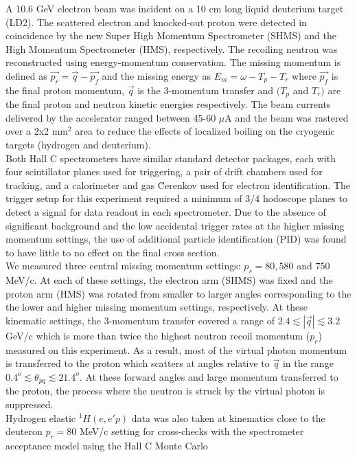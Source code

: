\indent A 10.6 GeV electron beam was incident on a 10 cm long liquid deuterium target (LD2). The scattered electron and knocked-out proton were detected in coincidence
by the new Super High Momentum Spectrometer (SHMS) and the High Momentum Spectrometer (HMS), respectively. The recoiling neutron was reconstructed using energy-momentum conservation. The missing momentum is defined as 
$\vec{p_{r}} = \vec{q} - \vec{p_{f}}$ and the missing  energy as $E_{m} = \omega - T_{p} - T_{r}$ where $\vec{p_{f}}$ is the final proton momentum, $\vec{q}$ is the 3-momentum transfer and $(T_{p}$ and $T_{r})$ are the
final proton and neutron kinetic energies respectively. The beam currents delivered by the accelerator ranged between 45-60 $\mu$A and the beam was rastered over a 2x2 mm$^{2}$ area to reduce the effects of localized boiling on the cryogenic targets (hydrogen and deuterium).\\
\indent Both Hall C spectrometers have similar standard detector packages, each with four scintillator planes\cite{hodo_techreport} used for triggering, a pair of drift chambers\cite{dc_techreport} used for tracking, and a calorimeter\cite{Mkrtchyan_2013} and gas \u{C}erenkov \cite{Li_Wenliang_mthesis,ngc_techreport} used for electron identification.
The trigger setup for this experiment required a minimum of 3/4 hodoscope planes to detect a signal for data readout in each spectrometer. Due to the absence of significant background and the low
accidental trigger rates at the higher missing momentum settings, the use of additional particle identification (PID) was found to have little to no effect on the final cross section.\\
\indent We measured three central missing momentum settings: $p_{r}=80,580$ and $750$ MeV/c. At each of these settings, the electron arm (SHMS) was fixed and the proton arm (HMS) was rotated from smaller to larger angles corresponding to the
the lower and higher missing momentum settings, respectively. At these kinematic settings, the 3-momentum transfer covered a range of $2.4\lesssim|\vec{q}|\lesssim3.2$ GeV/c which is more than twice the highest neutron recoil momentum ($p_{r}$)
measured on this experiment. As a result, most of the virtual photon momentum is transferred to the proton which scatters at angles relative to $\vec{q}$ in the range $0.4^{o}\lesssim \theta_{pq}\lesssim21.4^{o}$.
At these forward angles and large momentum transferred to the proton, the  process where the neutron is struck by the virtual photon is suppressed.\\
\indent Hydrogen elastic $^{1}H(e,e'p)$ data was also taken at kinematics close to the deuteron $p_{r}=80$ MeV/c setting for cross-checks with the spectrometer acceptance model using the  Hall C Monte Carlo
